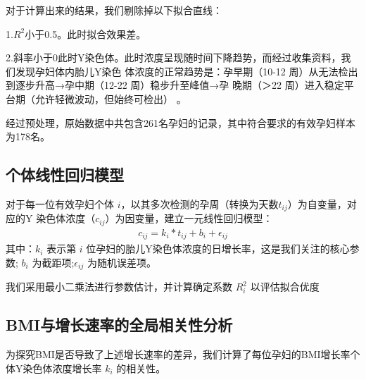 \documentclass{article}
\begin{document}
对于计算出来的结果，我们剔除掉以下拟合直线：

1.$R^2$小于0.5。此时拟合效果差。

2.斜率小于0此时Y染色体。此时浓度呈现随时间下降趋势，而经过收集资料，我们发现孕妇体内胎儿Y染色
体浓度的正常趋势是：孕早期（10-12 周）从无法检出到逐步升高→孕中期（12-22 周）稳步升至峰值→孕
晚期（＞22 周）进入稳定平台期（允许轻微波动，但始终可检出） 。

经过预处理，原始数据中共包含261名孕妇的记录，其中符合要求的有效孕妇样本为178名。
\subsection{个体线性回归模型}
对于每一位有效孕妇个体 $i$，以其多次检测的孕周（转换为天数$t_{ij}$）为自变量，对应的Y
染色体浓度（$c_{ij}$）为因变量，建立一元线性回归模型：
\begin{gather}
    c_{ij}=k_i*t_{ij}+b_i+\epsilon_{ij} \tag{1}
\end{gather}
其中：$k_i$ 表示第 $i$ 位孕妇的胎儿Y染色体浓度的日增长率，这是我们关注的核心参数;
$b_i$ 为截距项;$\epsilon_{ij}$ 为随机误差项。

我们采用最小二乘法进行参数估计，并计算确定系数 $R^2_i$ 以评估拟合优度

\subsection{BMI与增长速率的全局相关性分析}
为探究BMI是否导致了上述增长速率的差异，我们计算了每位孕妇的BMI增长率个体Y染色体浓度增长率 $k_i$ 的相关性。
\end{document}
